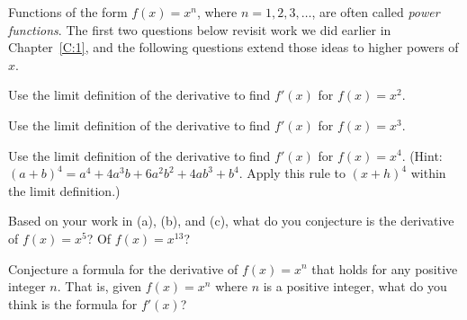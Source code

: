 \begin{pa} \label{PA:2.1}
Functions of the form $f(x) = x^n$, where $n = 1, 2, 3, \ldots$, are often called \emph{power functions}.  The first two questions below revisit work we did earlier in Chapter~\ref{C:1}, and the following questions extend those ideas to higher powers of $x$.
\ba
	\item Use the limit definition of the derivative to find $f'(x)$ for $f(x) = x^2$.
	\item Use the limit definition of the derivative to find $f'(x)$ for $f(x) = x^3$.
	\item Use the limit definition of the derivative to find $f'(x)$ for $f(x) = x^4$.  (Hint: $(a+b)^4 = a^4 + 4a^3b + 6a^2b^2 + 4ab^3 + b^4$.  Apply this rule to $(x+h)^4$ within the limit definition.)
	\item Based on your work in (a), (b), and (c), what do you conjecture is the derivative of $f(x) = x^5$?  Of $f(x) = x^{13}$?
	\item Conjecture a formula for the derivative of $f(x) = x^n$ that holds for any positive integer $n$.  That is, given $f(x) = x^n$ where $n$ is a positive integer, what do you think is the formula for $f'(x)$? 
\ea
\end{pa} \afterpa